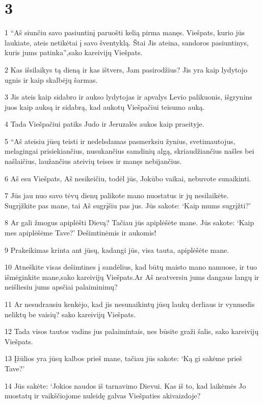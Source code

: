 \chapter{3}


\par 1 “Aš siunčiu savo pasiuntinį paruošti kelią pirma manęs. Viešpats, kurio jūs laukiate, ateis netikėtai į savo šventyklą. Štai Jis ateina, sandoros pasiuntinys, kuris jums patinka”,­sako kareivijų Viešpats. 
\par 2 Kas išsilaikys tą dieną ir kas ištvers, Jam pasirodžius? Jis yra kaip lydytojo ugnis ir kaip skalbėjų šarmas. 
\par 3 Jis ateis kaip sidabro ir aukso lydytojas ir apvalys Levio palikuonis, išgrynins juos kaip auksą ir sidabrą, kad aukotų Viešpačiui teisumo auką. 
\par 4 Tada Viešpačiui patiks Judo ir Jeruzalės aukos kaip praeityje. 
\par 5 “Aš ateisiu jūsų teisti ir nedelsdamas pasmerksiu žynius, svetimautojus, melagingai prisiekiančius, nusukančius samdinių algą, skriaudžiančius našles bei našlaičius, laužančius ateivių teises ir manęs nebijančius. 
\par 6 Aš esu Viešpats, Aš nesikeičiu, todėl jūs, Jokūbo vaikai, nebuvote sunaikinti. 
\par 7 Jūs jau nuo savo tėvų dienų palikote mano nuostatus ir jų nesilaikėte. Sugrįžkite pas mane, tai Aš sugrįšiu pas jus. Jūs sakote: ‘Kaip mums sugrįžti?’ 
\par 8 Ar gali žmogus apiplėšti Dievą? Tačiau jūs apiplėšėte mane. Jūs sakote: ‘Kaip mes apiplėšėme Tave?’ Dešimtinėmis ir aukomis! 
\par 9 Prakeikimas krinta ant jūsų, kadangi jūs, visa tauta, apiplėšėte mane. 
\par 10 Atneškite visas dešimtines į sandėlius, kad būtų maisto mano namuose, ir tuo išmėginkite mane,­sako kareivijų Viešpats.­Ar Aš neatversiu jums dangaus langų ir neišliesiu jums apsčiai palaiminimų? 
\par 11 Ar nesudrausiu kenkėjo, kad jis nesunaikintų jūsų laukų derliaus ir vynmedis neliktų be vaisių?­ sako kareivijų Viešpats.­ 
\par 12 Tada visos tautos vadins jus palaimintais, nes būsite graži šalis,­ sako kareivijų Viešpats.­ 
\par 13 Įžūlios yra jūsų kalbos prieš mane, tačiau jūs sakote: ‘Ką gi sakėme prieš Tave?’ 
\par 14 Jūs sakėte: ‘Jokios naudos iš tarnavimo Dievui. Kas iš to, kad laikėmės Jo nuostatų ir vaikščiojome nuleidę galvas Viešpaties akivaizdoje? 
